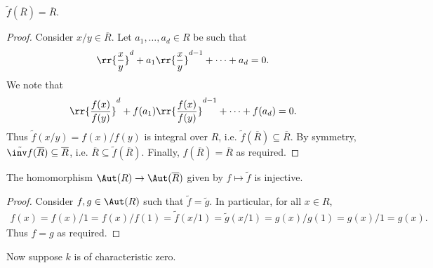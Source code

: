 \documentclass{article}
\begin{document}
\begin{claim*}[1b]
  $\tilde f(\overline R)=\overline R$.
  \begin{proof}
    Consider $x/y\in \overline R$. Let $a_1,\ldots,a_d\in R$ be such that
    \begin{align*}
      \rr{\frac{x}{y}}^d + a_1\rr{\frac{x}{y}}^{d-1} + \cdots + a_d = 0.
    \end{align*}
    We note that
    \begin{align*}
      \rr{\frac{f(x)}{f(y)}}^d + f(a_1)\rr{\frac{f(x)}{f(y)}}^{d-1} + \cdots + f(a_d) = 0.
    \end{align*}
    Thus $\tilde f(x/y)=f(x)/f(y)$ is integral over $R$, i.e. $\tilde f(\overline R)\subseteq\overline R$.
    By symmetry, $\tilde{\inv f}(\overline R)\subseteq\overline R$, i.e. $\overline R\subseteq \tilde f(\overline R)$.
    Finally, $f(\overline R)=\overline R$ as required.
  \end{proof}
\end{claim*}

\begin{claim*}[1c]
  The homomorphism $\Aut(R)\to\Aut(\overline R)$ given by $f\mapsto \tilde f$ is injective.
  \begin{proof}
    Consider $f,g\in\Aut(R)$ such that $\tilde f = \tilde g$. In particular,
    for all $x\in R$,
    \begin{align*}
      f(x) = f(x)/1 = f(x)/f(1) = \tilde f(x/1) = \tilde g(x/1) = g(x)/g(1) = g(x)/1 = g(x).
    \end{align*}
    Thus $f=g$ as required.
  \end{proof}
\end{claim*}

Now suppose $k$ is of characteristic zero.
\end{document}
